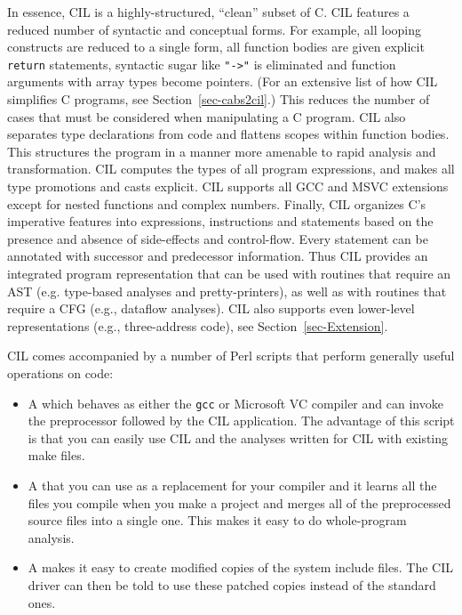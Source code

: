 \documentclass[letterpaper]{article}
\def\secref#1{Section~\ref{sec-#1}}
\def\t#1{{\tt #1}}
\begin{document}
 In essence, CIL is a highly-structured, ``clean'' subset of C. CIL features a
reduced number of syntactic and conceptual forms. For example, all looping
constructs are reduced to a single form, all function bodies are given
explicit {\tt return} statements, syntactic sugar like {\tt "->"} is
eliminated and function arguments with array types become pointers. (For an
extensive list of how CIL simplifies C programs, see \secref{cabs2cil}.)
This reduces the number of cases that must be considered when manipulating a C
program. CIL also separates type declarations from code and flattens scopes
within function bodies. This structures the program in a manner more amenable
to rapid analysis and transformation. CIL computes the types of all program
expressions, and makes all type promotions and casts explicit. CIL supports
all GCC and MSVC extensions except for nested functions and complex numbers.
Finally, CIL organizes C's imperative features into expressions, instructions
and statements based on the presence and absence of side-effects and
control-flow. Every statement can be annotated with successor and predecessor
information. Thus CIL provides an integrated program representation that can
be used with routines that require an AST (e.g. type-based analyses and
pretty-printers), as well as with routines that require a CFG (e.g., dataflow
analyses). CIL also supports even lower-level representations (e.g.,
three-address code), see \secref{Extension}. 

 CIL comes accompanied by a number of Perl scripts that perform generally
useful operations on code:
\begin{itemize}
\item A  which behaves as either the \t{gcc} or
Microsoft VC compiler and can invoke the preprocessor followed by the CIL
application. The advantage of this script is that you can easily use CIL and
the analyses written for CIL with existing make files.
\item A  that you can use as a
replacement for your compiler and it learns all the files you compile when you
make a project and merges all of the preprocessed source files into a single
one. This makes it easy to do whole-program analysis.
\item A  makes it easy to create modified
copies of the system include files. The CIL driver can then be told to use
these patched copies instead of the standard ones.
\end{itemize}
\end{document}
